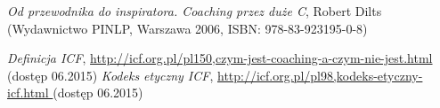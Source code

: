 \begin{thebibliography}{99}

 \textit{Od przewodnika do inspiratora. Coaching przez duże C}, Robert Dilts (Wydawnictwo PINLP, Warszawa 2006, ISBN: 978-83-923195-0-8)

 \textit{Definicja ICF}, \url{http://icf.org.pl/pl150,czym-jest-coaching-a-czym-nie-jest.html} (dostęp 06.2015)
 \textit{Kodeks etyczny ICF}, \url{ http://icf.org.pl/pl98,kodeks-etyczny-icf.html } (dostęp 06.2015)
\end{thebibliography}
